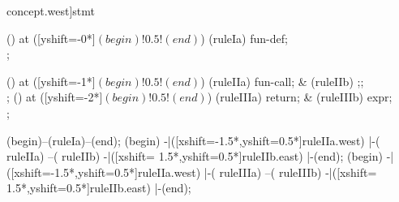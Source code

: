 \begin{syntax}[[xshift=20mm]concept.west]{stmt}
  
  \node[sequence,column sep=1.5cm] () at ([yshift=-0*\syntaxruledist]$(begin)!0.5!(end)$) {
    \node[nonterminal] (ruleIa) {fun-def};
    \\
  };
  
  \node[sequence,column sep=1.5cm] () at ([yshift=-1*\syntaxruledist]$(begin)!0.5!(end)$) {
    \node[nonterminal] (ruleIIa) {fun-call};
    &
    \node[terminal]    (ruleIIb) {;};
    \\
  };
  \node[sequence,column sep=1.5cm] () at ([yshift=-2*\syntaxruledist]$(begin)!0.5!(end)$) {
    \node[terminal]    (ruleIIIa) {return};
    &
    \node[nonterminal] (ruleIIIb) {expr};
    \\
  };
  
  \draw[path] (begin)--(ruleIa)--(end);
  \draw[path] (begin)
            -|([xshift=-1.5*\syntaxruledist,yshift=0.5*\syntaxruledist]ruleIIa.west)
            |-(                                                         ruleIIa)
            --(                                                         ruleIIb)
            -|([xshift= 1.5*\syntaxruledist,yshift=0.5*\syntaxruledist]ruleIIb.east)
            |-(end);
  \draw[path] (begin)
            -|([xshift=-1.5*\syntaxruledist,yshift=0.5*\syntaxruledist]ruleIIa.west)
            |-(                                                         ruleIIIa)
            --(                                                         ruleIIIb)
            -|([xshift= 1.5*\syntaxruledist,yshift=0.5*\syntaxruledist]ruleIIb.east)
            |-(end);
\end{syntax}

